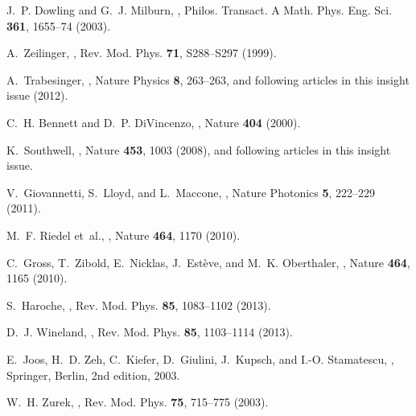 \documentclass[12pt]{article}
\begin{document}
\begin{thebibliography}{100}

J.~P. Dowling and G.~J. Milburn,
,
\newblock Philos. Transact. A Math. Phys. Eng. Sci. {\bf 361}, 1655--74 (2003).

A.~Zeilinger,
,
\newblock Rev. Mod. Phys. {\bf 71}, S288–S297 (1999).

A.~Trabesinger,
,
\newblock Nature Physics {\bf 8}, 263--263, and following articles in this
  insight issue (2012).

C.~H. Bennett and D.~P. DiVincenzo,
,
\newblock Nature {\bf 404} (2000).

K.~Southwell,
,
\newblock Nature {\bf 453}, 1003 (2008),
\newblock and following articles in this insight issue.

V.~Giovannetti, S.~Lloyd, and L.~Maccone,
,
\newblock Nature Photonics {\bf 5}, 222--229 (2011).

M.~F. Riedel et~al.,
,
\newblock Nature {\bf 464}, 1170 (2010).

C.~Gross, T.~Zibold, E.~Nicklas, J.~Est\`{e}ve, and M.~K. Oberthaler,
,
\newblock Nature {\bf 464}, 1165 (2010).

S.~Haroche,
,
\newblock Rev. Mod. Phys. {\bf 85}, 1083--1102 (2013).

D.~J. Wineland,
,
\newblock Rev. Mod. Phys. {\bf 85}, 1103--1114 (2013).

E.~Joos, H.~D. Zeh, C.~Kiefer, D.~Giulini, J.~Kupsch, and I.-O. Stamatescu,
,
\newblock Springer, Berlin, 2nd edition, 2003.

W.~H. Zurek,
,
\newblock Rev. Mod. Phys. {\bf 75}, 715--775 (2003).


\end{thebibliography}
\end{document}

